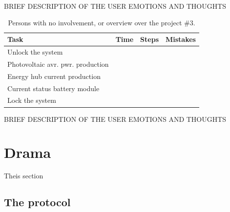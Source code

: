 BRIEF DESCRIPTION OF THE USER EMOTIONS AND THOUGHTS\\

\begin{table}[!h]
\begin{tabular}{ | l | l | l | l |}
	\hline
	Task & Time & Steps & Mistakes \\ \hline
	Unlock the system & & & \\ \hline
	Photovoltaic avr. pwr. production & & & \\ \hline
	Energy hub current production & & & \\ \hline
	Current status battery module & & & \\ \hline
	Lock the system & & & \\ \hline
\end{tabular}
\caption{Persons with no involvement, or overview over the project \#3.}
\end{table}

BRIEF DESCRIPTION OF THE USER EMOTIONS AND THOUGHTS




\section{Drama}
Theis section

\subsection{The protocol}





